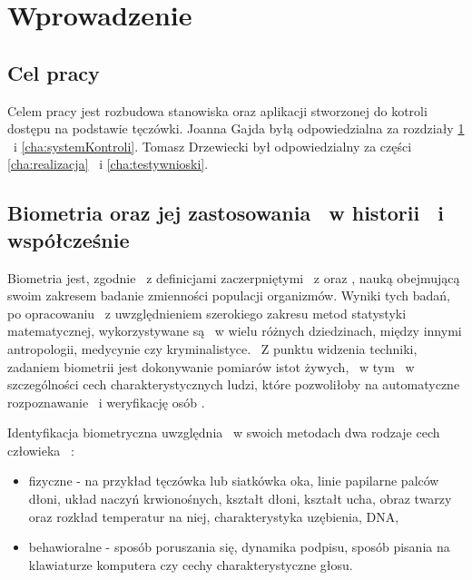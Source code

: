 \chapter{Wprowadzenie}
\label{cha:wprowadzenie}


\section{Cel pracy}
\label{sec:cel}
Celem pracy jest rozbudowa stanowiska oraz aplikacji stworzonej do kotroli dostępu na podstawie tęczówki. Joanna Gajda byłą odpowiedzialna za rozdziały \ref{cha:wprowadzenie} ~i \ref{cha:systemKontroli}. Tomasz Drzewiecki był odpowiedzialny za części \ref{cha:realizacja} ~i \ref{cha:testywnioski}.

\section{Biometria oraz jej zastosowania ~w historii ~i współcześnie}
\label{sec:biometria}

Biometria jest, zgodnie ~z definicjami zaczerpniętymi ~z \cite{Ko75} oraz \cite{Bio01}, nauką obejmującą swoim zakresem badanie zmienności populacji organizmów. Wyniki tych badań, po opracowaniu ~z uwzględnieniem szerokiego zakresu metod statystyki matematycznej, wykorzystywane są ~w wielu różnych dziedzinach, między innymi antropologii, medycynie czy kryminalistyce. ~Z punktu widzenia techniki, zadaniem biometrii jest dokonywanie pomiarów istot żywych, ~w tym ~w szczególności cech charakterystycznych ludzi, które pozwoliłoby na automatyczne rozpoznawanie ~i weryfikację osób \cite{Bio01}\cite{Jain00}.

Identyfikacja biometryczna uwzględnia ~w swoich metodach dwa rodzaje cech człowieka ~\cite{Bio01}\cite{Bio02}\cite{Jain00}\cite{Jain08}:
\begin{itemize} 
\item fizyczne - na przykład tęczówka lub siatkówka oka, linie papilarne palców dłoni, układ naczyń krwionośnych, kształt dłoni, kształt ucha, obraz twarzy oraz rozkład temperatur na niej, charakterystyka uzębienia, DNA, 
\item behawioralne - sposób poruszania się, dynamika podpisu, sposób pisania na klawiaturze komputera czy cechy charakterystyczne głosu.
\end{itemize}

